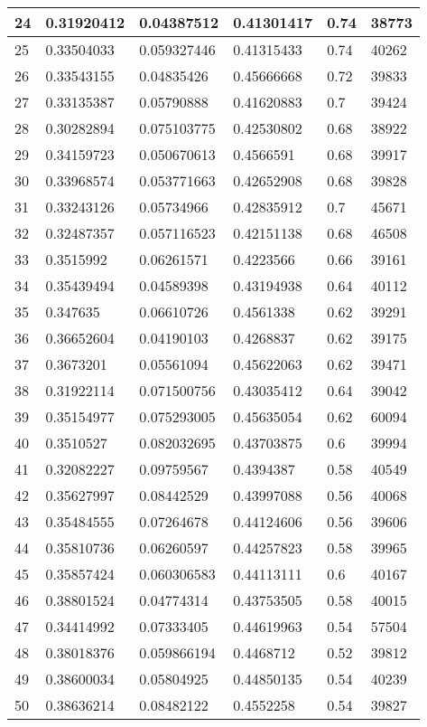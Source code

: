 \begin{longtable}{|l|l|l|l|l|l|}
24 & 0.31920412 & 0.04387512 & 0.41301417 & 0.74 & 38773 \\ \hline 
25 & 0.33504033 & 0.059327446 & 0.41315433 & 0.74 & 40262 \\ \hline 
26 & 0.33543155 & 0.04835426 & 0.45666668 & 0.72 & 39833 \\ \hline 
27 & 0.33135387 & 0.05790888 & 0.41620883 & 0.7 & 39424 \\ \hline 
28 & 0.30282894 & 0.075103775 & 0.42530802 & 0.68 & 38922 \\ \hline 
29 & 0.34159723 & 0.050670613 & 0.4566591 & 0.68 & 39917 \\ \hline 
30 & 0.33968574 & 0.053771663 & 0.42652908 & 0.68 & 39828 \\ \hline 
31 & 0.33243126 & 0.05734966 & 0.42835912 & 0.7 & 45671 \\ \hline 
32 & 0.32487357 & 0.057116523 & 0.42151138 & 0.68 & 46508 \\ \hline 
33 & 0.3515992 & 0.06261571 & 0.4223566 & 0.66 & 39161 \\ \hline 
34 & 0.35439494 & 0.04589398 & 0.43194938 & 0.64 & 40112 \\ \hline 
35 & 0.347635 & 0.06610726 & 0.4561338 & 0.62 & 39291 \\ \hline 
36 & 0.36652604 & 0.04190103 & 0.4268837 & 0.62 & 39175 \\ \hline 
37 & 0.3673201 & 0.05561094 & 0.45622063 & 0.62 & 39471 \\ \hline 
38 & 0.31922114 & 0.071500756 & 0.43035412 & 0.64 & 39042 \\ \hline 
39 & 0.35154977 & 0.075293005 & 0.45635054 & 0.62 & 60094 \\ \hline 
40 & 0.3510527 & 0.082032695 & 0.43703875 & 0.6 & 39994 \\ \hline 
41 & 0.32082227 & 0.09759567 & 0.4394387 & 0.58 & 40549 \\ \hline 
42 & 0.35627997 & 0.08442529 & 0.43997088 & 0.56 & 40068 \\ \hline 
43 & 0.35484555 & 0.07264678 & 0.44124606 & 0.56 & 39606 \\ \hline 
44 & 0.35810736 & 0.06260597 & 0.44257823 & 0.58 & 39965 \\ \hline 
45 & 0.35857424 & 0.060306583 & 0.44113111 & 0.6 & 40167 \\ \hline 
46 & 0.38801524 & 0.04774314 & 0.43753505 & 0.58 & 40015 \\ \hline 
47 & 0.34414992 & 0.07333405 & 0.44619963 & 0.54 & 57504 \\ \hline 
48 & 0.38018376 & 0.059866194 & 0.4468712 & 0.52 & 39812 \\ \hline 
49 & 0.38600034 & 0.05804925 & 0.44850135 & 0.54 & 40239 \\ \hline 
50 & 0.38636214 & 0.08482122 & 0.4552258 & 0.54 & 39827 \\ \hline 
\end{longtable}
